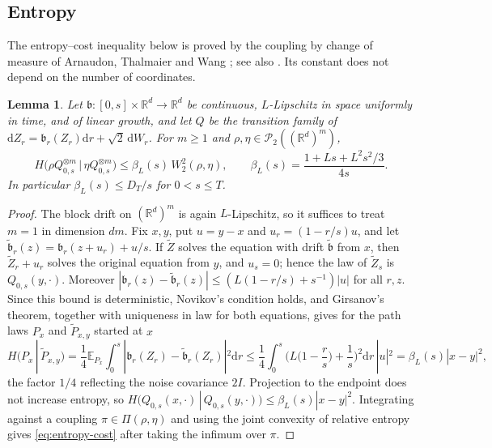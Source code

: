 \documentclass[11pt]{amsart}
\numberwithin{equation}{section}
\theoremstyle{plain}
\newtheorem{lemma}[theorem]{Lemma}
\theoremstyle{remark}
\newcommand{\R}{\mathbb{R}}
\newcommand{\E}{\mathbb{E}}
\newcommand{\cP}{\mathcal{P}}
\newcommand{\W}{W_2}
\newcommand{\dd}{\mathrm{d}}
\begin{document}
\subsection{Entropy}
The entropy--cost inequality below is proved by the coupling by change of measure of Arnaudon, Thalmaier and Wang \cite{ATW06}; see also \cite{RW10,Wan13}. Its constant does not depend on the number of coordinates.

\begin{lemma}\label{lem:entropy-cost}
Let $\mathfrak b\colon[0,s]\times\R^d\to\R^d$ be continuous, $L$-Lipschitz in space uniformly in time, and of linear growth, and let $Q$ be the transition family of $\dd Z_r=\mathfrak b_r(Z_r)\dd r+\sqrt2\,\dd W_r$. For $m\ge1$ and $\rho,\eta\in\cP_2((\R^d)^m)$,
\begin{equation}\label{eq:entropy-cost}
H\big(\rho Q_{0,s}^{\otimes m}\,\big|\,\eta Q_{0,s}^{\otimes m}\big)\le\beta_L(s)\,\W^2(\rho,\eta),\qquad \beta_L(s)=\frac{1+Ls+L^2s^2/3}{4s}.
\end{equation}
In particular $\beta_L(s)\le D_T/s$ for $0<s\le T$.
\end{lemma}

\begin{proof}
The block drift on $(\R^d)^m$ is again $L$-Lipschitz, so it suffices to treat $m=1$ in dimension $dm$. Fix $x,y$, put $u=y-x$ and $u_r=(1-r/s)u$, and let $\tilde{\mathfrak b}_r(z)=\mathfrak b_r(z+u_r)+u/s$. If $\tilde Z$ solves the equation with drift $\tilde{\mathfrak b}$ from $x$, then $\tilde Z_r+u_r$ solves the original equation from $y$, and $u_s=0$; hence the law of $\tilde Z_s$ is $Q_{0,s}(y,\cdot)$. Moreover $|\mathfrak b_r(z)-\tilde{\mathfrak b}_r(z)|\le(L(1-r/s)+s^{-1})|u|$ for all $r,z$. Since this bound is deterministic, Novikov's condition holds, and Girsanov's theorem, together with uniqueness in law for both equations, gives for the path laws $P_x$ and $\tilde P_{x,y}$ started at $x$
\[
H(P_x\,|\,\tilde P_{x,y})=\frac14\E_{P_x}\int_0^s|\mathfrak b_r(Z_r)-\tilde{\mathfrak b}_r(Z_r)|^2\dd r\le\frac14\int_0^s\Big(L\Big(1-\frac rs\Big)+\frac1s\Big)^2\dd r\,|u|^2=\beta_L(s)|x-y|^2,
\]
the factor $1/4$ reflecting the noise covariance $2I$. Projection to the endpoint does not increase entropy, so $H(Q_{0,s}(x,\cdot)\,|\,Q_{0,s}(y,\cdot))\le\beta_L(s)|x-y|^2$. Integrating against a coupling $\pi\in\Pi(\rho,\eta)$ and using the joint convexity of relative entropy gives \eqref{eq:entropy-cost} after taking the infimum over $\pi$.
\end{proof}
\end{document}
